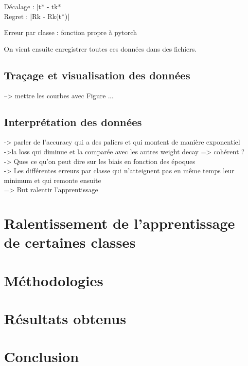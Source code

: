 \documentclass[12pt,english, openany]{book}
\begin{document}
Décalage : |t* - tk*|\\
Regret : |Rk - Rk(t*)|

Erreur par classe : fonction propre à pytorch

On vient ensuite enregistrer toutes ces données dans des fichiers.
\section{Traçage et visualisation des données}
--> mettre les courbes avec Figure ...

\section{Interprétation des données}
-> parler de l'accuracy qui a des paliers et qui montent de manière exponentiel\\
->la loss qui diminue et la comparée avec les autres weight decay => cohérent ?\\
-> Ques ce qu'on peut dire sur les biais en fonction des époques\\
-> Les différentes erreurs par classe qui n'atteignent pas en même temps leur minimum et qui remonte ensuite \\

=> But ralentir l'apprentissage 

\chapter{Ralentissement de l'apprentissage de certaines classes}


\chapter{Méthodologies}



	

 




\chapter{Résultats obtenus}




\chapter{Conclusion}



\end{document}

